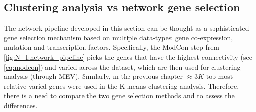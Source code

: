 



\subsection{Clustering analysis vs network gene selection} \label{s:N_I:cs_vs_gene_sel}

The network pipeline developed in this section can be thought as a sophisticated gene selection mechanism based on multiple data-types: gene co-expression, mutation and transcription factors. Specifically, the ModCon step from  \cref{fig:N_I:network_pipeline} picks the genes that have the highest connectivity (see \cref{eq:modcon}) and varied across the dataset, which are then used for clustering analysis (through MEV). Similarly, in the previous chapter $\approx3K$ top most relative varied genes were used in the K-means clustering analysis. Therefore, there is a need to compare the two gene selection methods and to assess the differences.

